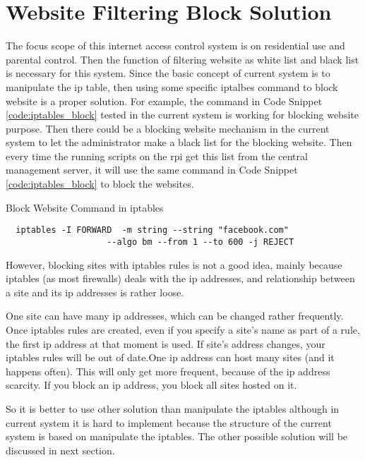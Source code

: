 \section{Website Filtering Block Solution}
\par The focus scope of this internet access control system is on residential use and parental control. Then the function of filtering website as white list and black list is necessary for this system. Since the basic concept of current system is to manipulate the \gls{ip} table, then using some specific iptalbes command to block website is a proper solution. For example, the command in Code Snippet \ref{code:iptables_block} tested in the current system is working for blocking website purpose. Then there could be a blocking website mechanism in the current system to let the administrator make a black list for the blocking website. Then every time the running scripts on the \gls{rpi} get this list from the central management server, it will use the same command in Code Snippet \ref{code:iptables_block}
 to block the websites.
\begin{algorithm}[h]
  \caption{Block Website Command in iptables}
  \label{code:iptables_block}
  \begin{verbatim}
  iptables -I FORWARD  -m string --string "facebook.com" 
  					--algo bm --from 1 --to 600 -j REJECT
 \end{verbatim}
\end{algorithm}

\par However, blocking sites with iptables rules is not a good idea, mainly because iptables (as most firewalls) deals with the \gls{ip} addresses, and relationship between a site and its \gls{ip} addresses is rather loose.

\par One site can have many \gls{ip} addresses, which can be changed rather frequently. Once iptables rules are created, even if you specify a site's name as part of a rule, the first \gls{ip} address at that moment is used. If site's address changes, your iptables rules will be out of date.One \gls{ip} address can host many sites (and it happens often). This will only get more frequent, because of the \gls{ip} address scarcity. If you block an \gls{ip} address, you block all sites hosted on it.

\par So it is better to use other solution than manipulate the iptables although in current system it is hard to implement because the structure of the current system is based on manipulate the iptables. The other possible solution will be discussed in next section.

